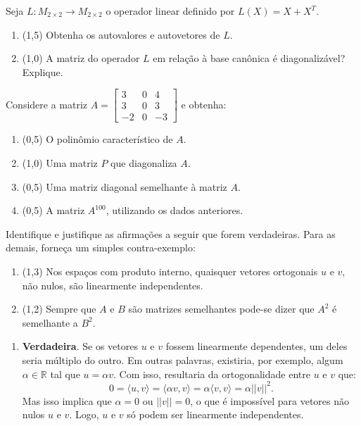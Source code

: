 \documentclass[12pt,a4paper]{article}
\newcommand{\fixme}{{\color{red}(...)}}
\newcommand{\norm}[1]{\left|\left|{#1}\right|\right|}
\newcommand*\R{\mathbb{R}}
\begin{document}
\begin{ExerciseList}
\Exercise[title={2,5}] Seja $L: M_{2\times 2} \to M_{2\times 2}$ o operador linear definido por $L(X) = X + X^T$.
\begin{enumerate}
\item (1,5) Obtenha os autovalores e autovetores de $L$.
\item (1,0) A matriz do operador $L$ em relação à base canônica é diagonalizável? Explique.
\end{enumerate}
\Answer \fixme


\Exercise[title={2,5}] Considere a matriz $A =
\begin{bmatrix}
 3 &  0 &  4\\
 3 &  0 &  3\\
-2 &  0 & -3
\end{bmatrix}$ e obtenha:
\begin{enumerate}
\item (0,5) O polinômio característico de $A$.
\item (1,0) Uma matriz $P$ que diagonaliza $A$.
\item (0,5) Uma matriz diagonal semelhante à matriz $A$.
\item (0,5) A matriz $A^{100}$, utilizando os dados anteriores.
\end{enumerate}
\Answer \fixme


\Exercise[title={2,5}] Identifique e justifique as afirmações a seguir que forem verdadeiras. Para as demais, forneça um simples contra-exemplo:
\begin{enumerate}
\item (1,3) Nos espaços com produto interno, quaisquer vetores ortogonais $u$ e $v$, não nulos, são linearmente independentes.
\item (1,2) Sempre que $A$ e $B$ são matrizes semelhantes pode-se dizer que $A^2$ é semelhante a $B^2$.
\end{enumerate}
\Answer
\begin{enumerate}
\item \textbf{Verdadeira}. Se os vetores $u$ e $v$ fossem linearmente dependentes, um deles seria múltiplo do outro. Em outras palavras, existiria, por exemplo, algum $\alpha \in \R$ tal que $u = \alpha v$. Com isso, resultaria da ortogonalidade entre $u$ e $v$ que:
\[
0
= \langle u,v \rangle
= \langle \alpha v, v \rangle
= \alpha \langle v, v \rangle
= \alpha \norm{v}^2.
\]
Mas isso implica que $\alpha = 0$ ou $\norm{v} = 0$, o que é impossível para vetores não nulos $u$ e $v$. Logo, $u$ e $v$ só podem ser linearmente independentes.


\end{enumerate}
\end{ExerciseList}
\end{document}
